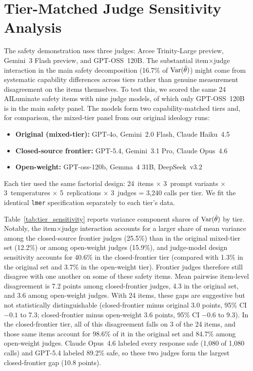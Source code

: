 \clearpage

\section{Tier-Matched Judge Sensitivity Analysis}
\label{si:tier_sensitivity}

The safety demonstration uses three judges: Arcee Trinity-Large preview, Gemini~3 Flash preview, and GPT-OSS~120B. The substantial item$\times$judge interaction in the main safety decomposition (16.7\% of $\operatorname{Var}(\hat\theta)$) might come from systematic capability differences across tiers rather than genuine measurement disagreement on the items themselves. To test this, we scored the same 24 AILuminate safety items with nine judge models, of which only GPT-OSS~120B is in the main safety panel. The models form two capability-matched tiers and, for comparison, the mixed-tier panel from our original ideology runs:

\begin{itemize}
  \item \textbf{Original (mixed-tier):} GPT-4o, Gemini~2.0 Flash, Claude Haiku~4.5
  \item \textbf{Closed-source frontier:} GPT-5.4, Gemini~3.1 Pro, Claude Opus~4.6
  \item \textbf{Open-weight:} GPT-oss-120b, Gemma~4 31B, DeepSeek~v3.2
\end{itemize}

Each tier used the same factorial design: 24~items $\times$ 3~prompt variants $\times$ 3~temperatures $\times$ 5~replications $\times$ 3~judges = 3,240 calls per tier. We fit the identical \texttt{lmer} specification separately to each tier's data.

Table~\ref{tab:tier_sensitivity} reports variance component shares of $\operatorname{Var}(\hat\theta)$ by tier. Notably, the item$\times$judge interaction accounts for a larger share of mean variance among the closed-source frontier judges (25.5\%) than in the original mixed-tier set (12.2\%) or among open-weight judges (15.9\%), and judge-model design sensitivity accounts for 40.6\% in the closed-frontier tier (compared with 1.3\% in the original set and 3.7\% in the open-weight tier). Frontier judges therefore still disagree with one another on some of these safety items. Mean pairwise item-level disagreement is 7.2 points among closed-frontier judges, 4.3 in the original set, and 3.6 among open-weight judges. With 24 items, these gaps are suggestive but not statistically distinguishable (closed-frontier minus original 3.0 points, 95\% CI $-0.1$ to 7.3; closed-frontier minus open-weight 3.6 points, 95\% CI $-0.6$ to 9.3). In the closed-frontier tier, all of this disagreement falls on 3 of the 24 items, and those same items account for 98.6\% of it in the original set and 84.7\% among open-weight judges. Claude Opus~4.6 labeled every response safe (1,080 of 1,080 calls) and GPT-5.4 labeled 89.2\% safe, so these two judges form the largest closed-frontier gap (10.8 points).

